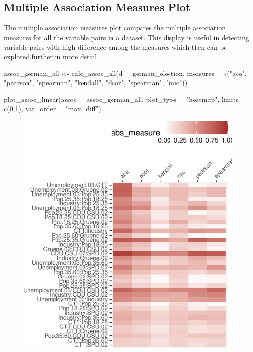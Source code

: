\begin{Schunk}
\begin{figure}
\end{figure}
\end{Schunk}

\hypertarget{multiple-association-measures-plot}{%
\subsection{Multiple Association Measures
Plot}\label{multiple-association-measures-plot}}

The multiple association measures plot compares the multiple association
measures for all the variable pairs in a dataset. This display is useful
in detecting variable pairs with high difference among the measures
which then can be explored further in more detail.

\begin{Schunk}
\begin{Sinput}
assoc_german_all <- calc_assoc_all(d = german_election,
                                   measures = c("ace",
                                                "pearson",
                                                "spearman",
                                                "kendall",
                                                "dcor",
                                                "spearman",
                                                "mic"))

plot_assoc_linear(assoc = assoc_german_all, 
                  plot_type = "heatmap",
                  limits = c(0,1),
                  var_order = "max_diff")
\end{Sinput}
\begin{figure}

{\centering \includegraphics{rj_paper_files/figure-latex/compare-linear-heatmap-1} 

}
\end{figure}
\end{Schunk}
